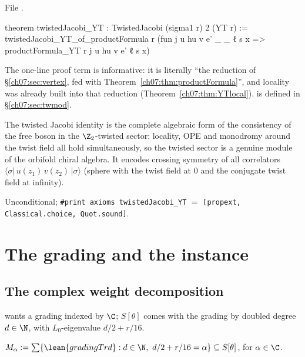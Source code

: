 \noindent File .
\begin{leancode}
theorem twistedJacobi_YT : TwistedJacobi (sigma1 r) 2 (YT r) :=
  twistedJacobi_YT_of_productFormula r
    (fun j u hu v e' _ _ ℓ s x => productFormula_YT r j u hu v e' ℓ s x)
\end{leancode}

\begin{dictionary}
The one-line proof term is informative: it is literally ``the reduction of
\S\ref{ch07:sec:vertex}, fed with Theorem~\ref{ch07:thm:productFormula}'', and locality was
already built into that reduction (Theorem~\ref{ch07:thm:YTlocal}).  is
defined in \S\ref{ch07:sec:twmod}.
\end{dictionary}

\begin{physics}
The twisted Jacobi identity is the complete algebraic form of the consistency of the free boson in the $\Z_2$-twisted sector: locality, OPE and monodromy around the twist field all hold simultaneously, so the twisted sector is a genuine module of the orbifold chiral algebra. It encodes crossing symmetry of all correlators $\langle\sigma|\,u(z_1)\,v(z_2)\,|\sigma\rangle$ (sphere with the twist field at $0$ and the conjugate twist field at infinity).
\end{physics}

\begin{status}
Unconditional; \verb|#print axioms twistedJacobi_YT| $=$ \texttt{[propext, Classical.choice,
Quot.sound]}.
\end{status}

\section{The grading and the instance}\label{ch07:sec:instance}

\subsection{The complex weight decomposition}

 wants a grading indexed by $\C$; $S[\theta]$ comes with the grading
 by doubled degree $d\in\N$, with $L_0$-eigenvalue $d/2+r/16$.

\begin{definition}\label{ch07:def:weightC}
$M_\alpha := \sum\{\lean{gradingT r d} : d\in\N,\ d/2+r/16 = \alpha\}\subseteq S[\theta]$, for
$\alpha\in\C$.
\end{definition}

